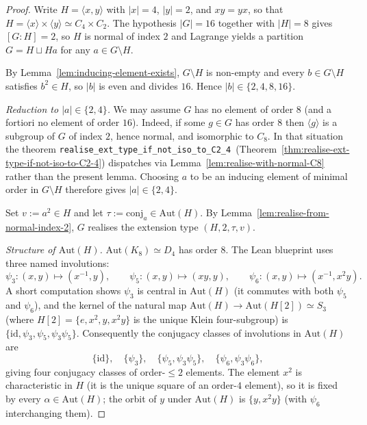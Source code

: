 \begin{proof}
  Write $H = \langle x, y \rangle$ with $|x| = 4$, $|y| = 2$, and $xy = yx$,
  so that $H = \langle x \rangle \times \langle y \rangle \simeq C_4 \times
  C_2$. The hypothesis $|G| = 16$ together with $|H| = 8$ gives $[G : H] = 2$,
  so $H$ is normal of index $2$ and Lagrange yields a partition $G = H \sqcup
  Ha$ for any $a \in G \setminus H$.

  By Lemma~\ref{lem:inducing-element-exists}, $G \setminus H$ is non-empty and
  every $b \in G \setminus H$ satisfies $b^2 \in H$, so $|b|$ is even and
  divides $16$. Hence $|b| \in \{2, 4, 8, 16\}$.

  \smallskip
  \noindent
  \emph{Reduction to $|a| \in \{2, 4\}$.} We may assume $G$ has no element of
  order $8$ (and a fortiori no element of order $16$). Indeed, if some
  $g \in G$ has order $8$ then $\langle g \rangle$ is a subgroup of $G$ of
  index $2$, hence normal, and isomorphic to $C_8$. In that situation the
  theorem
  \texttt{realise\_ext\_type\_if\_not\_iso\_to\_C2\_4}~(Theorem~\ref{thm:realise-ext-type-if-not-iso-to-C2-4})
  dispatches via Lemma~\ref{lem:realise-with-normal-C8} rather than the
  present lemma. Choosing $a$ to be an inducing element of minimal order in
  $G \setminus H$ therefore gives $|a| \in \{2, 4\}$.

  Set $v := a^2 \in H$ and let $\tau := \mathrm{conj}_a \in \mathrm{Aut}(H)$.
  By Lemma~\ref{lem:realise-from-normal-index-2}, $G$ realises the extension
  type $(H, 2, \tau, v)$.

  \smallskip
  \noindent
  \emph{Structure of $\mathrm{Aut}(H)$.} $\mathrm{Aut}(K_8) \simeq D_4$ has
  order $8$. The Lean blueprint uses three named involutions:
  \[
    \psi_3 : (x, y) \mapsto (x^{-1}, y), \qquad
    \psi_5 : (x, y) \mapsto (xy, y), \qquad
    \psi_6 : (x, y) \mapsto (x^{-1}, x^2 y).
  \]
  A short computation shows $\psi_3$ is central in $\mathrm{Aut}(H)$ (it
  commutes with both $\psi_5$ and $\psi_6$), and the kernel of the natural map
  $\mathrm{Aut}(H) \to \mathrm{Aut}(H[2]) \simeq S_3$ (where $H[2] = \{e, x^2,
  y, x^2 y\}$ is the unique Klein four-subgroup) is
  $\{\mathrm{id}, \psi_3, \psi_5, \psi_3 \psi_5\}$. Consequently the
  conjugacy classes of involutions in $\mathrm{Aut}(H)$ are
  \[
    \{\mathrm{id}\}, \quad \{\psi_3\}, \quad \{\psi_5, \psi_3 \psi_5\},
    \quad \{\psi_6, \psi_3 \psi_6\},
  \]
  giving four conjugacy classes of order-$\le 2$ elements. The element $x^2$
  is characteristic in $H$ (it is the unique square of an order-$4$ element),
  so it is fixed by every $\alpha \in \mathrm{Aut}(H)$; the orbit of $y$ under
  $\mathrm{Aut}(H)$ is $\{y, x^2 y\}$ (with $\psi_6$ interchanging them).


\end{proof}
